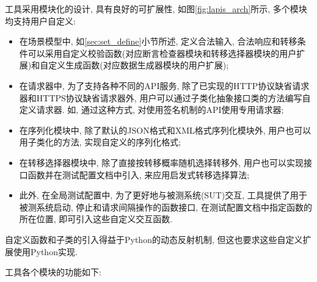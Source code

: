 	    工具采用模块化的设计, 具有良好的可扩展性, 如图\ref{fig:lapis_arch}所示, 多个模块均支持用户自定义:
	    \begin{itemize}
	        \item 在场景模型中, 如\ref{sec:set_define}小节所述, 定义合法输入, 合法响应和转移条件可以采用自定义校验函数(对应断言检查器模块和转移选择器模块的用户扩展)和自定义生成函数(对应数据生成器模块的用户扩展);
	        
	        \item 在请求器中, 为了支持各种不同的API服务, 除了已实现的HTTP协议缺省请求器和HTTPS协议缺省请求器外, 用户可以通过子类化抽象接口类的方法编写自定义请求器. 如, 通过这种方式, 对使用签名机制的API使用专用请求器;
	        
	        \item 在序列化模块中, 除了默认的JSON格式和XML格式序列化模块外, 用户也可以用子类化的方法, 实现自定义的序列化格式;
	        
	        \item 在转移选择器模块中, 除了直接按转移概率随机选择转移外, 用户也可以实现接口函数并在测试配置文档中引入, 来应用启发式转移选择算法;
	        
	        \item 此外, 在全局测试配置中, 为了更好地与被测系统(SUT)交互, 工具提供了用于被测系统启动, 停止和请求间隔操作的函数接口, 在测试配置文档中指定函数的所在位置, 即可引入这些自定义交互函数.
	    \end{itemize}  
	    自定义函数和子类的引入得益于Python的动态反射机制, 但这也要求这些自定义扩展使用Python实现.
	    
	    工具各个模块的功能如下:
	    
